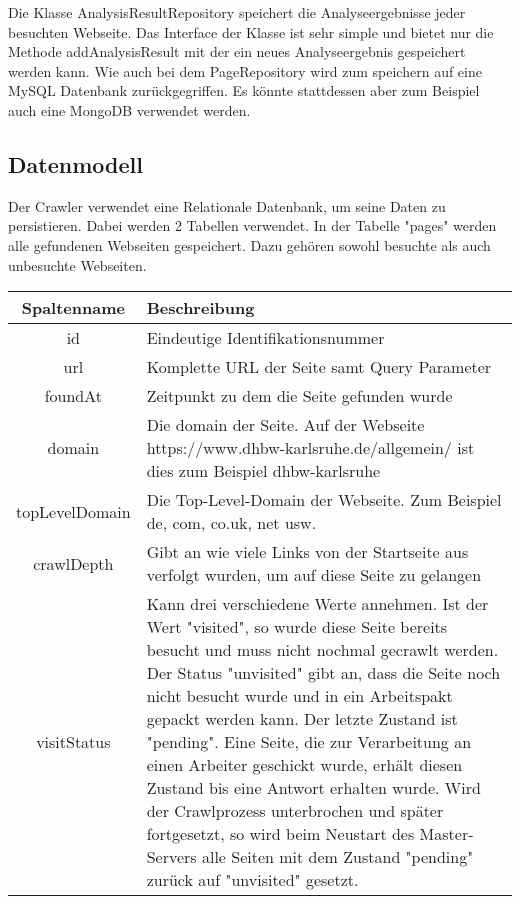 Die Klasse AnalysisResultRepository speichert die Analyseergebnisse jeder besuchten Webseite. Das Interface der Klasse ist sehr simple und bietet nur die Methode addAnalysisResult mit der ein neues Analyseergebnis gespeichert werden kann. Wie auch bei dem PageRepository wird zum speichern auf eine MySQL Datenbank zurückgegriffen. Es könnte stattdessen aber zum Beispiel auch eine MongoDB verwendet werden.


\subsection{Datenmodell}
Der Crawler verwendet eine Relationale Datenbank, um seine Daten zu persistieren. Dabei werden 2 Tabellen verwendet. In der Tabelle "pages" werden alle gefundenen Webseiten gespeichert. Dazu gehören sowohl besuchte als auch unbesuchte Webseiten.


\begin{tabular}{c|p{10cm}}
	Spaltenname & Beschreibung  \\ 
	\hline\hline
	id & Eindeutige Identifikationsnummer \\ 
	\hline 
	url & Komplette URL der Seite samt Query Parameter \\
	\hline 
	foundAt & Zeitpunkt zu dem die Seite gefunden wurde \\
	\hline 
	domain & Die domain der Seite. Auf der Webseite https://www.dhbw-karlsruhe.de/allgemein/ ist dies zum Beispiel dhbw-karlsruhe \\
	\hline 
	topLevelDomain & Die Top-Level-Domain der Webseite. Zum Beispiel de, com, co.uk, net usw.  \\
	\hline 
	crawlDepth & Gibt an wie viele Links von der Startseite aus verfolgt wurden, um auf diese Seite zu gelangen \\
	\hline 
	visitStatus & Kann drei verschiedene Werte annehmen. Ist der Wert "visited", so wurde diese Seite bereits besucht und muss nicht nochmal gecrawlt werden. Der Status "unvisited" gibt an, dass die Seite noch nicht besucht wurde und in ein Arbeitspakt gepackt werden kann. Der letzte Zustand ist "pending". Eine Seite, die zur Verarbeitung an einen Arbeiter geschickt wurde, erhält diesen Zustand bis eine Antwort erhalten wurde. Wird der Crawlprozess unterbrochen und später fortgesetzt, so wird beim Neustart des Master-Servers alle Seiten mit dem Zustand "pending" zurück auf "unvisited" gesetzt. \\
\end{tabular} 


